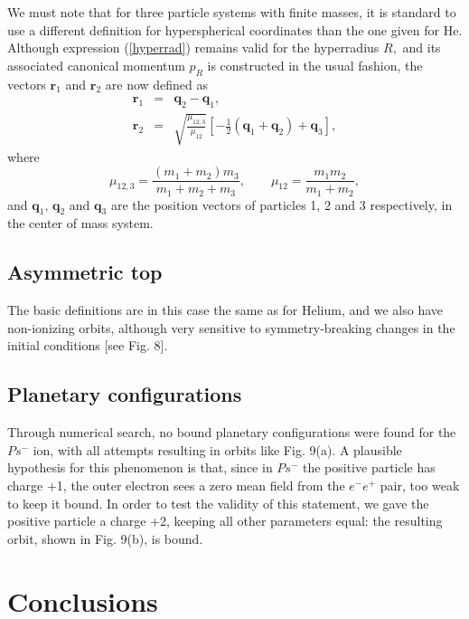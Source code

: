\documentclass[thmsa]{article}
\begin{document}
We must note that for three particle systems with finite masses, it is
standard \cite{Botero} to use a different definition for hyperspherical
coordinates than the one given for He. Although expression (\ref{hyperrad})
remains valid for the hyperradius $R,$ and its associated canonical momentum 
$p_R$ is constructed in the usual fashion, the vectors $\mathbf{r}_1$ and $%
\mathbf{r}_2$ are now defined as 
\begin{eqnarray}
\mathbf{r}_1 &=&\mathbf{q}_2-\mathbf{q}_1, \\
\mathbf{r}_2 &=&\sqrt{\frac{\mu _{12,3}}{\mu _{12}}}\left[ -\frac 12\left( 
\mathbf{q}_1+\mathbf{q}_2\right) +\mathbf{q}_3\right] ,
\end{eqnarray}
where 
\begin{equation}
\mu _{12,3}=\frac{\left( m_1+m_2\right) m_3}{m_1+m_2+m_3},\quad \quad \mu
_{12}=\frac{m_1m_2}{m_1+m_2},
\end{equation}
and $\mathbf{q}_1,\,\mathbf{q}_2$ and $\mathbf{q}_3$ are the position
vectors of particles 1, 2 and 3 respectively, in the center of mass system.

\subsection{Asymmetric top}

The basic definitions are in this case the same as for Helium, and we also
have non-ionizing orbits, although very sensitive to symmetry-breaking
changes in the initial conditions [see Fig. 8].

\subsection{Planetary configurations}

Through numerical search, no bound planetary configurations were found for
the $Ps^{-}$ ion, with all attempts resulting in orbits like Fig. 9(a). A
plausible hypothesis for this phenomenon is that, since in $Ps^{-}$ the
positive particle has charge +1, the outer electron sees a zero mean field
from the $e^{-}e^{+}$ pair, too weak to keep it bound. In order to test the
validity of this statement, we gave the positive particle a charge +2,
keeping all other parameters equal: the resulting orbit, shown in Fig. 9(b),
is bound.

\section{Conclusions}
\end{document}
